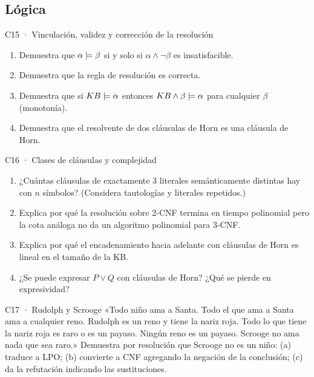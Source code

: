 \subsection{Lógica}

\begin{ejercicio}{C15 · Vinculación, validez y corrección de la resolución }
\begin{enumerate}[label=(\alph*)]
\item Demuestra que $\alpha\models\beta$ si y solo si $\alpha\wedge\neg\beta$ es insatisfacible.
\item Demuestra que la regla de resolución es correcta.
\item Demuestra que si $KB\models\alpha$ entonces $KB\wedge\beta\models\alpha$ para cualquier $\beta$ (monotonía).
\item Demuestra que el resolvente de dos cláusulas de Horn es una cláusula de Horn.
\end{enumerate}
\end{ejercicio}

\begin{ejercicio}{C16 · Clases de cláusulas y complejidad }
\begin{enumerate}[label=(\alph*)]
\item ¿Cuántas cláusulas de exactamente 3 literales semánticamente distintas hay con $n$ símbolos?
(Considera tautologías y literales repetidos.)
\item Explica por qué la resolución sobre 2-CNF termina en tiempo polinomial pero la cota análoga
no da un algoritmo polinomial para 3-CNF.
\item Explica por qué el encadenamiento hacia adelante con cláusulas de Horn es lineal en el tamaño de la KB.
\item ¿Se puede expresar $P\vee Q$ con cláusulas de Horn? ¿Qué se pierde en expresividad?
\end{enumerate}
\end{ejercicio}

\begin{ejercicio}{C17 · Rudolph y Scrooge }
«Todo niño ama a Santa. Todo el que ama a Santa ama a cualquier reno. Rudolph es un reno y tiene
la nariz roja. Todo lo que tiene la nariz roja es raro o es un payaso. Ningún reno es un payaso.
Scrooge no ama nada que sea raro.» Demuestra por resolución que Scrooge no es un niño:
(a) traduce a LPO; (b) convierte a CNF agregando la negación de la conclusión; (c) da la refutación
indicando las sustituciones.
\end{ejercicio}

